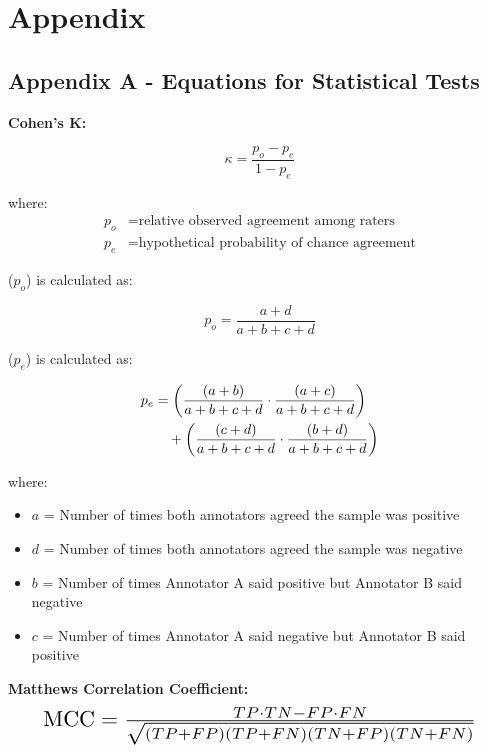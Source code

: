 \documentclass[10.7pt, twocolumn]{article}
\begin{document}
\section{Appendix}

\subsection{Appendix A - Equations for Statistical Tests}


\textbf{Cohen's K:}

\begin{equation}
  \kappa = \frac{p_o - p_e}{1 - p_e}
  \end{equation}
  
  where:
  \begin{align*}
  p_o & = \text{relative observed agreement among raters} \\
  p_e & = \text{hypothetical probability of chance agreement}
  \end{align*}
  
  ($p_o$) is calculated as:
  
  \begin{equation}
  p_o = \frac{a + d}{a + b + c + d}
  \end{equation}
  
  ($p_e$) is calculated as:
  
  \begin{align}
    p_e &= \left(\frac{(a + b)}{a + b + c + d} \cdot \frac{(a + c)}{a + b + c + d}\right) \notag \\
    &\quad + \left(\frac{(c + d)}{a + b + c + d} \cdot \frac{(b + d)}{a + b + c + d}\right)
    \end{align}

  where:
  \begin{itemize}
      \item $a$ = Number of times both annotators agreed the sample was positive
      \item $d$ = Number of times both annotators agreed the sample was negative
      \item $b$ = Number of times Annotator A said positive but Annotator B said negative
      \item $c$ = Number of times Annotator A said negative but Annotator B said positive
  \end{itemize}

  \textbf{Matthews Correlation Coefficient:}
  \begin{equation}
    \resizebox{0.9\hsize}{!}{$
    \text{MCC} = \frac{TP \cdot TN - FP \cdot FN}{\sqrt{(TP + FP)(TP + FN)(TN + FP)(TN + FN)}}
    $}
    \end{equation}
\end{document}
